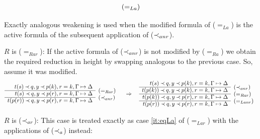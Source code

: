 \begin{PROOF}
\begin{LS}
\[\begin{array}{rl}
\raisebox{1.2ex}[1.5ex][0ex]{$(=_{La})$}
\end{array} \] 
Exactly analogous weakening is used when the modified formula of ($=_{La}$)
is the active formula of the subsequent application of ($\mathbin{\prec}_{anr}$).
%
\item $R$ is ($=_{Rar}$):
If the active formula of ($\mathbin{\prec}_{anr}$) is not modified by ($=_{Ra}$) we
obtain the required reduction in height by swapping analogous to the previous
case. So, assume it was modified.
\[ \begin{array}{rl}
t(s) \Incl q, y\Incl p(k), r=k, \Gamma\Seq\Delta \\ \cline{1-1}
t(s)\Incl q, y\Incl p(r), r=k, \Gamma\Seq\Delta &
\raisebox{1.2ex}[1.5ex][0ex]{$(=_{Rar})$} \\ \cline{1-1}
t(p(r))\Incl q, y\Incl p(r), r=k, \Gamma\Seq\Delta &
\raisebox{1.2ex}[1.5ex][0ex]{$(\Incl_{anr})$} 
\end{array} \conv
 \begin{array}{rl}
t(s) \Incl q, y\Incl p(k), r=k, \Gamma\Seq\Delta \\ \cline{1-1}
t(p(k))\Incl q, y\Incl p(k), r=k, \Gamma\Seq\Delta &
\raisebox{1.2ex}[1.5ex][0ex]{$(\Incl_{anr})$} \\ \cline{1-1}
t(p(k))\Incl q, y\Incl p(r), r=k, \Gamma\Seq\Delta &
\raisebox{1.2ex}[1.5ex][0ex]{$(=_{Rar})$} \\ \cline{1-1}
t(p(r))\Incl q, y\Incl p(r), r=k, \Gamma\Seq\Delta & \rabove{(=_{Lanr})}
\end{array} \]
%
\item $R$ is ($\mathbin{\prec}_{ar}$): This case is treated exactly as case \ref{it:eqLa} of
($=_{Lar}$) with the applications of ($\mathbin{\prec}_a$) instead:

\end{LS}
\end{PROOF}
